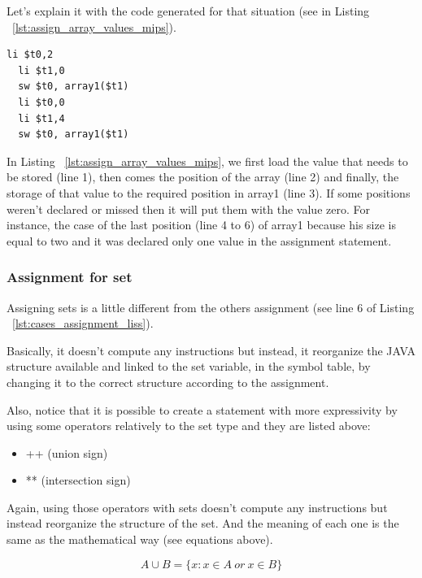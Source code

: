 \documentclass[
  oneside,
  11pt, a4paper,
  footinclude=true,
  headinclude=true,
  cleardoublepage=empty
]{scrbook}
\begin{document}
Let's explain it with the code generated for that situation (see in Listing ~\ref{lst:assign_array_values_mips}).

\begin{lstlisting}[caption={Code generated for line 5 of Listing ~\ref{lst:cases_assignment_liss}},label={lst:assign_array_values_mips}]
  li $t0,2		
  li $t1,0		
  sw $t0, array1($t1)		
  li $t0,0		
  li $t1,4		
  sw $t0, array1($t1)		
\end{lstlisting}

In Listing ~\ref{lst:assign_array_values_mips}, we first load the value that needs to be stored (line 1), then comes the position of the array (line 2) and finally, the storage of that value to the required position in array1 (line 3). If some positions weren't declared or missed then it will put them with the value zero. For instance, the case of the last position (line 4 to 6) of array1 because his size is equal to two and it was declared only one value in the assignment statement.

\subsubsection{Assignment for set}

Assigning sets is a little different from the others assignment (see line 6 of Listing ~\ref{lst:cases_assignment_liss}).

Basically, it doesn't compute any instructions but instead, it reorganize the JAVA structure available and linked to the set variable, in the symbol table, by changing it to the correct structure according to the assignment.

Also, notice that it is possible to create a statement with more expressivity by using some operators relatively to the set type and they are listed above:

\begin{itemize}
\item ++ (union sign)
\item ** (intersection sign)
\end{itemize}

Again, using those operators with sets doesn't compute any instructions but instead reorganize the structure of the set. And the meaning of each one is the same as the mathematical way (see equations above).

\begin{equation}
  A \cup B = \{ x : x \in A\ or\ x \in B\}
\end{equation}
\end{document}
